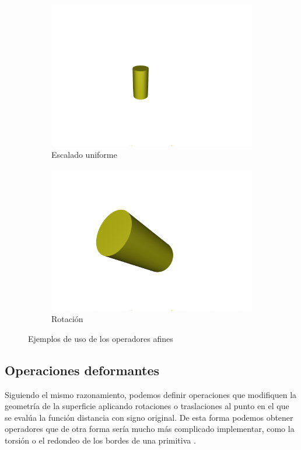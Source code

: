 \begin{figure}[ht!]
\begin{subfigure}[b]{0.24\textwidth}
        \centering
        \includegraphics[width=\textwidth]{Plantilla-TFG-master/img/afin_scale.png}
        \caption{Escalado uniforme}
    \end{subfigure}
    \hfill
    \begin{subfigure}[b]{0.24\textwidth}
        \centering
        \includegraphics[width=\textwidth]{Plantilla-TFG-master/img/afin_rot.png}
        \caption{Rotación}
    \end{subfigure}
    \hfill
   
    \caption{Ejemplos de uso de los operadores afines}
\end{figure}

\subsection{Operaciones deformantes}
Siguiendo el mismo razonamiento, podemos definir operaciones que modifiquen la geometría de la superficie aplicando rotaciones o traslaciones al punto en el que se evalúa la función distancia con signo original. De esta forma podemos obtener operadores que de otra forma sería mucho más complicado implementar, como la torsión o el redondeo de los bordes de una primitiva \cite{deform}.

